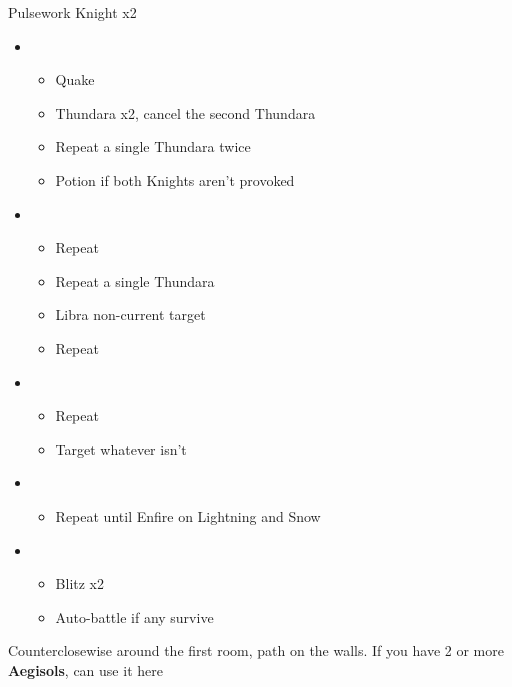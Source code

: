 \begin{battle}{Pulsework Knight x2}
\begin{itemize}
    \item \first
    \begin{itemize}
        \item Quake
        \item Thundara x2, cancel the second Thundara
        \item Repeat a single Thundara twice
        \item Potion if both Knights aren't provoked
    \end{itemize}
    \item \third
    \begin{itemize}
        \item Repeat
        \item Repeat a single Thundara
        \item Libra non-current target
        \item Repeat
    \end{itemize}
    \item \fourth
    \begin{itemize}
        \item Repeat
        \item Target whatever isn't \stagger
    \end{itemize}
    \item \fifth
    \begin{itemize}
        \item Repeat until Enfire on Lightning and Snow
    \end{itemize}
    \item \sixth
    \begin{itemize}
        \item Blitz x2
        \item Auto-battle if any survive
    \end{itemize}
\end{itemize}
\end{battle}
Counterclosewise around the first room, path on the walls.
\newpage
If you have 2 or more \textbf{Aegisols}, can use it here
